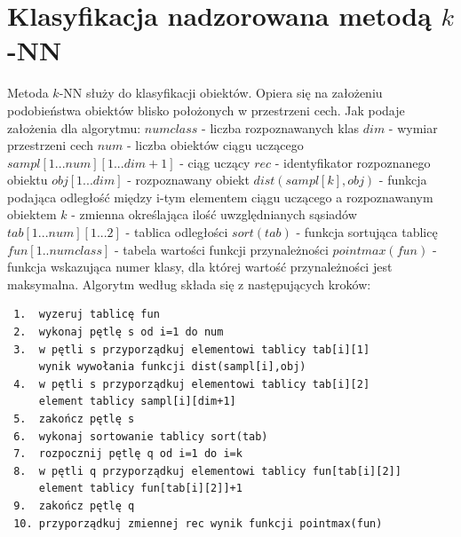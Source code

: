 \documentclass{classrep}
\begin{document}
\section{Klasyfikacja nadzorowana metodą $k$-NN}
Metoda $k$-NN służy do klasyfikacji obiektów. Opiera się na założeniu podobieństwa obiektów blisko położonych w przestrzeni cech. Jak podaje  założenia dla algorytmu:
\newline $numclass$ - liczba rozpoznawanych klas
\newline $dim$ - wymiar przestrzeni cech
\newline $num$ - liczba obiektów ciągu uczącego
\newline $sampl[1... num][1...dim+1]$ - ciąg uczący
\newline $rec$ - identyfikator rozpoznanego obiektu
\newline $obj[1...dim]$ - rozpoznawany obiekt
\newline $dist(sampl[k],obj)$ - funkcja podająca odległość między i-tym elementem ciągu uczącego a rozpoznawanym obiektem  
\newline $k$ - zmienna określająca ilość uwzględnianych sąsiadów
\newline $tab[1...num][1...2]$ - tablica odległości
\newline $sort(tab)$ - funkcja sortująca tablicę
\newline $fun[1..numclass]$ - tabela wartości funkcji przynależności
\newline $pointmax(fun)$  - funkcja wskazująca numer klasy, dla której wartość przynależności jest maksymalna. Algorytm według składa się z następujących kroków:
\newline
\begin{verbatim}
 1.  wyzeruj tablicę fun
 2.  wykonaj pętlę s od i=1 do num
 3.  w pętli s przyporządkuj elementowi tablicy tab[i][1]
     wynik wywołania funkcji dist(sampl[i],obj)
 4.  w pętli s przyporządkuj elementowi tablicy tab[i][2]
     element tablicy sampl[i][dim+1]
 5.  zakończ pętlę s
 6.  wykonaj sortowanie tablicy sort(tab)
 7.  rozpocznij pętlę q od i=1 do i=k
 8.  w pętli q przyporządkuj elementowi tablicy fun[tab[i][2]]
     element tablicy fun[tab[i][2]]+1
 9.  zakończ pętlę q
 10. przyporządkuj zmiennej rec wynik funkcji pointmax(fun)
\end{verbatim}
\end{document}
